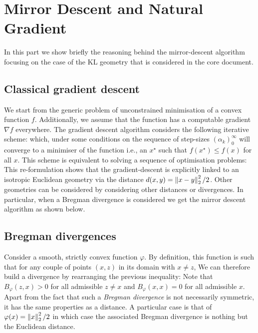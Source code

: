 
\section{\label{app:MDA+NG}Mirror Descent and Natural Gradient}

In this part we show briefly the reasoning behind the mirror-descent algorithm focusing on the case of the KL geometry that is considered in the core document.

\subsection{Classical gradient descent}
We start from the generic problem of unconstrained minimisation of a convex function $f$. Additionally, we assume that the function has a computable gradient $\nabla f$ everywhere. The gradient descent algorithm considers the following iterative scheme:
which, under some conditions on the sequence of step-sizes $(\alpha_{k})_{0}^{\infty}$ will converge to a minimiser of the function i.e., an $x^{\star}$ such that $f(x^{\star})\le f(x)$ for all $x$. This scheme is equivalent to solving a sequence of optimisation problems:
This re-formulation shows that the gradient-descent is explicitly linked to an isotropic Euclidean geometry via the distance $d(x,y)=\left\|x-y\right\|_{2}^{2}/2$. Other geometries can be considered by considering other distances or divergences. In particular, when a Bregman divergence is considered we get the mirror descent algorithm as shown below.

\subsection{Bregman divergences}
Consider a smooth, strictly convex function $\varphi$. By definition, this function is such that for any couple of points $(x,z)$ in its domain with $x\neq z$, 
We can therefore build a divergence by rearranging the previous inequality:
Note that $B_{\varphi}(z,x)>0$ for all admissible $z\neq x$ and $B_{\varphi}(x,x)=0$ for all admissible $x$. Apart from the fact that such a \emph{Bregman divergence} is not necessarily symmetric, it has the same properties as a distance. A particular case is that of $\varphi(x)=\left\|x\right\|_{2}^{2}/2$ in which case the associated Bregman divergence is nothing but the Euclidean distance.

